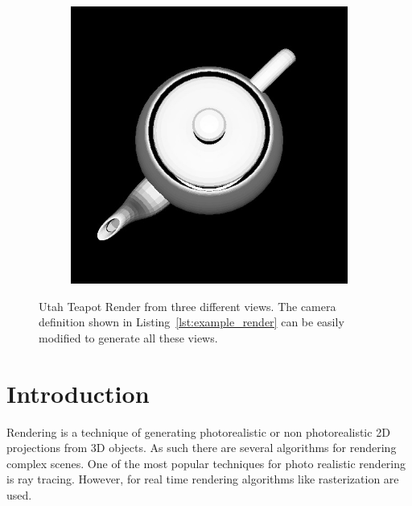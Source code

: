 \documentclass{juliacon}
\begin{document}
\begin{figure}[!htb]
\begin{subfigure}[b]{0.3\textwidth}
        \caption*{}
    \end{subfigure}
    \hfill
    \begin{subfigure}[b]{0.3\textwidth}
        \centering
        \includegraphics[width=\textwidth]{images/render/teapot_top.jpg}
        \caption*{}
    \end{subfigure}
    \caption{Utah Teapot Render from three different views. The camera definition shown in Listing~\protect\ref{lst:example_render} can be easily modified to generate all these views.}
    \label{fig:teapot_render}
\end{figure}

\section{Introduction}
\label{intro}

Rendering is a technique of generating photorealistic or non photorealistic 2D projections from 3D objects. As such there are several algorithms for rendering complex scenes. One of the most popular techniques for photo realistic rendering is ray tracing. However, for real time rendering algorithms like rasterization are used.
\end{document}
